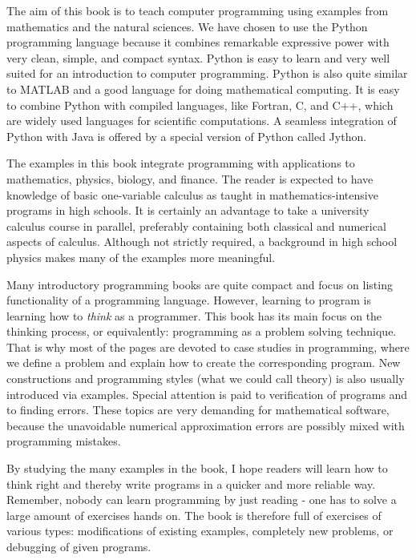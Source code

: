 \documentclass[graybox,sectrefs,envcountresetchap,open=right,final]{svmonodo}
\begin{document}
The aim of this book is to teach computer programming using examples
from mathematics and the natural sciences.  We have chosen to use the
Python programming language because it combines remarkable expressive
power with very clean, simple, and compact syntax.  Python is easy to
learn and very well suited for an introduction to computer
programming. Python is also quite similar to MATLAB and a good
language for doing mathematical computing.  It is easy to combine
Python with compiled languages, like Fortran, C, and C++, which are
widely used languages for scientific computations.  A seamless
integration of Python with Java is offered by a special version of
Python called Jython.

The examples in this book integrate programming with applications to
mathematics, physics, biology, and finance.  The reader is expected to
have knowledge of basic one-variable calculus as taught in
mathematics-intensive programs in high schools. It is certainly an
advantage to take a university calculus course in parallel, preferably
containing both classical and numerical aspects of calculus.  Although
not strictly required, a background in high school physics makes many
of the examples more meaningful.

Many introductory programming books are quite compact and focus on
listing functionality of a programming language. However, learning to
program is learning how to \emph{think} as a programmer.  This book
has its main focus on the thinking process, or equivalently:
programming as a problem solving technique. That is why most of the
pages are devoted to case studies in programming, where we define a
problem and explain how to create the corresponding program.  New
constructions and programming styles (what we could call theory) is also usually
introduced via examples.  Special attention is paid to verification of
programs and to finding errors. These topics are very demanding for
mathematical software, because the unavoidable numerical
approximation errors are possibly mixed with programming mistakes.

By studying the many examples in the
book, I hope readers will learn how to think right and thereby
write programs in a quicker and more reliable way. Remember, nobody can learn
programming by just reading - one has to solve a large amount of
exercises hands on.  The book is therefore full of exercises of
various types: modifications of existing examples, completely new
problems, or debugging of given programs.
\end{document}
